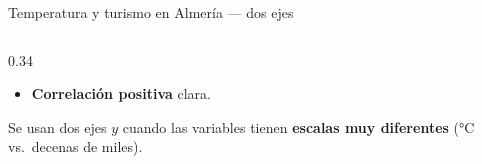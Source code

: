 \documentclass[aspectratio=169, 10pt, spanish]{beamer}
\begin{document}
\begin{frame}{Temperatura y turismo en Almería — dos ejes}
\begin{columns}[c]
\begin{column}{0.34\textwidth}
\begin{itemize}
              los turistas también $\uparrow$.
        \item \textbf{Correlación positiva} clara.
      \end{itemize}
      \vspace{6pt}
      \begin{notabox}
        \AlmFontFootnote
        Se usan dos ejes $y$ cuando las
        variables tienen \textbf{escalas muy
        diferentes} (°C vs.\ decenas de miles).
      \end{notabox}
    \end{column}
  \end{columns}
\end{frame}

\end{document}

